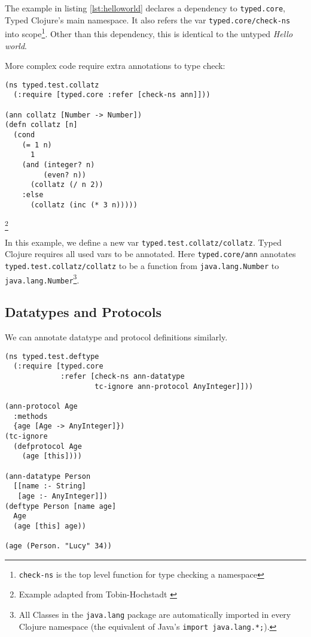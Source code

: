 The example in listing \ref{lst:helloworld} declares a dependency to 
\lstinline|typed.core|, Typed Clojure's main namespace. It also refers the var \lstinline|typed.core/check-ns|
into scope\footnote{\lstinline|check-ns| is the top level function for type checking a namespace}.
Other than this dependency, this is identical to the untyped \emph{Hello world}.

More complex code require extra annotations to type check:

\begin{lstlisting}[caption=Annotating vars in Typed Clojure]
(ns typed.test.collatz
  (:require [typed.core :refer [check-ns ann]]))

(ann collatz [Number -> Number])
(defn collatz [n]
  (cond
    (= 1 n) 
      1
    (and (integer? n) 
         (even? n)) 
      (collatz (/ n 2))
    :else 
      (collatz (inc (* 3 n)))))
\end{lstlisting}
\footnote{Example adapted from Tobin-Hochstadt \cite{Tob10}}

In this example, we define a new var \lstinline|typed.test.collatz/collatz|. Typed Clojure requires all 
used vars to be annotated. Here \lstinline|typed.core/ann| annotates \lstinline|typed.test.collatz/collatz|
to be a function from \lstinline{java.lang.Number} to 
\lstinline{java.lang.Number}\footnote{All Classes in the \lstinline|java.lang| package
are automatically imported in every Clojure namespace (the equivalent of Java's \lstinline|import java.lang.*;|).}.

\subsection{Datatypes and Protocols}

We can annotate datatype and protocol definitions similarly.

\begin{lstlisting}[caption=Annotating protocols and datatypes in Typed Clojure]
(ns typed.test.deftype
  (:require [typed.core 
             :refer [check-ns ann-datatype
                     tc-ignore ann-protocol AnyInteger]]))

(ann-protocol Age 
  :methods
  {age [Age -> AnyInteger]})
(tc-ignore
  (defprotocol Age
    (age [this])))

(ann-datatype Person 
  [[name :- String]
   [age :- AnyInteger]])
(deftype Person [name age]
  Age
  (age [this] age))

(age (Person. "Lucy" 34))
\end{lstlisting}

